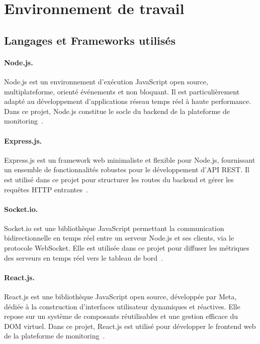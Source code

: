 \section{Environnement de travail}

\subsection{Langages et Frameworks utilisés}

\paragraph{Node.js.} Node.js est un environnement d'exécution JavaScript open source, multiplateforme, orienté événements et non bloquant. Il est particulièrement adapté au développement d'applications réseau temps réel à haute performance. Dans ce projet, Node.js constitue le socle du backend de la plateforme de monitoring~\cite{nodejs}.


\paragraph{Express.js.} Express.js est un framework web minimaliste et flexible pour Node.js, fournissant un ensemble de fonctionnalités robustes pour le développement d'API REST. Il est utilisé dans ce projet pour structurer les routes du backend et gérer les requêtes HTTP entrantes~\cite{express}.


\paragraph{Socket.io.} Socket.io est une bibliothèque JavaScript permettant la communication bidirectionnelle en temps réel entre un serveur Node.js et ses clients, via le protocole WebSocket. Elle est utilisée dans ce projet pour diffuser les métriques des serveurs en temps réel vers le tableau de bord~\cite{socketio}.


\paragraph{React.js.} React.js est une bibliothèque JavaScript open source, développée par Meta, dédiée à la construction d'interfaces utilisateur dynamiques et réactives. Elle repose sur un système de composants réutilisables et une gestion efficace du DOM virtuel. Dans ce projet, React.js est utilisé pour développer le frontend web de la plateforme de monitoring~\cite{react}.

